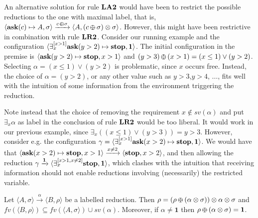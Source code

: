 \documentclass{llncs}
\newcommand{\ask}{{\bf ask}}
\newcommand{\ostop}{{\bf stop}}
\def\monid{{\mathbf 0}}
\def\odiv{\, {\ominus\hspace{-7.7pt} \div} \,}
\def\monid{\mathbf{1}}
\begin{document}
\begin{remark}
An alternative solution for rule ${\bf LA2}$ would have been to restrict the possible reductions to the one with maximal label, 
that is, $\langle \hbox{\ask}(c) \mapsto A, \sigma \rangle \xrightarrow{c \odiv \sigma} \langle A, (c \odiv \sigma) \otimes \sigma \rangle$. 
However, this might have been restrictive in combination with rule ${\bf LR2}$.
Consider  our running example and the configuration 
$\langle \exists^{[x > 1]}_x \hbox{\ask}(y > 2) \mapsto \hbox{\ostop}, \monid \rangle$. The initial configuration in the premise is
$\langle \hbox{\ask}(y > 2) \mapsto \hbox{\ostop}, x > 1 \rangle$ and $(y > 3) \odiv (x > 1) = (x \leq 1) \vee (y > 2)$.
Selecting $\alpha = (x \leq 1) \vee (y > 2)$ is problematic, since $x$ occurs free. Instead, the choice of $\alpha = (y > 2)$,
or any other value such as $y > 3$,$ y > 4$, $\ldots$, fits well with the intuition of some information  from the environment 
triggering the reduction.

Note instead that the choice of removing the requirement $x \not \in sv(\alpha)$ and put $\exists_x \alpha$ as label in the 
conclusion of rule ${\bf LR2}$ would  be too liberal. It would work in our previous example, since 
$\exists_x((x \leq 1) \vee (y > 3)) = y > 3$. However, consider e.g. 
the configuration $\gamma = \langle \exists^{[x > 1]}_x \hbox{\ask}(x > 2) \mapsto \hbox{\ostop}, \monid \rangle$. 
We would have that 
$\langle \hbox{\ask}(x > 2) \mapsto \hbox{\ostop}, x > 1 \rangle \xrightarrow{x \neq 2} \langle \hbox{\ostop}, x > 2 \rangle$,
and then allowing the reduction $\gamma \xrightarrow{\monid} \langle \exists^{[x > 1, x \neq 2]}_x \hbox{\ostop}, \monid \rangle$,
which clashes with the intuition that receiving information should not enable reductions involving (necessarily) 
the restricted variable.
\end{remark}

\begin{lemma}
\label{l-mono}
Let $\langle A, \sigma \rangle \xrightarrow{\alpha} \langle B, \rho \rangle$ be a labelled reduction. 
Then 
$\rho = (\rho \odiv (\alpha \otimes \sigma)) \otimes \alpha \otimes \sigma$ and 
$fv(\langle B, \rho \rangle) \subseteq fv(\langle A, \sigma \rangle) \cup sv(\alpha)$.
Moreover, if $\alpha \neq \monid$ then $\rho \odiv (\alpha \otimes \sigma) = \monid$.
\end{lemma}
\end{document}
